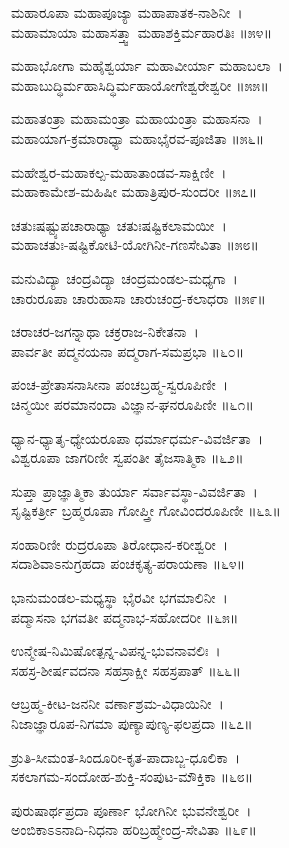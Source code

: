 ಮಹಾರೂಪಾ ಮಹಾಪೂಜ್ಯಾ ಮಹಾಪಾತಕ-ನಾಶಿನೀ~।\\
ಮಹಾಮಾಯಾ ಮಹಾಸತ್ತ್ವಾ ಮಹಾಶಕ್ತಿರ್ಮಹಾರತಿಃ ॥೫೪॥

ಮಹಾಭೋಗಾ ಮಹೈಶ್ವರ್ಯಾ ಮಹಾವೀರ್ಯಾ ಮಹಾಬಲಾ~।\\
ಮಹಾಬುದ್ಧಿರ್ಮಹಾಸಿದ್ಧಿರ್ಮಹಾಯೋಗೇಶ್ವರೇಶ್ವರೀ ॥೫೫॥

ಮಹಾತಂತ್ರಾ ಮಹಾಮಂತ್ರಾ ಮಹಾಯಂತ್ರಾ ಮಹಾಸನಾ~।\\
ಮಹಾಯಾಗ-ಕ್ರಮಾರಾಧ್ಯಾ ಮಹಾಭೈರವ-ಪೂಜಿತಾ ॥೫೬॥

ಮಹೇಶ್ವರ-ಮಹಾಕಲ್ಪ-ಮಹಾತಾಂಡವ-ಸಾಕ್ಷಿಣೀ~।\\
ಮಹಾಕಾಮೇಶ-ಮಹಿಷೀ ಮಹಾತ್ರಿಪುರ-ಸುಂದರೀ ॥೫೭॥

ಚತುಃಷಷ್ಟ್ಯುಪಚಾರಾಢ್ಯಾ ಚತುಃಷಷ್ಟಿಕಲಾಮಯೀ~।\\
ಮಹಾಚತುಃ-ಷಷ್ಟಿಕೋಟಿ-ಯೋಗಿನೀ-ಗಣಸೇವಿತಾ ॥೫೮॥

ಮನುವಿದ್ಯಾ ಚಂದ್ರವಿದ್ಯಾ ಚಂದ್ರಮಂಡಲ-ಮಧ್ಯಗಾ~।\\
ಚಾರುರೂಪಾ ಚಾರುಹಾಸಾ ಚಾರುಚಂದ್ರ-ಕಲಾಧರಾ ॥೫೯॥

ಚರಾಚರ-ಜಗನ್ನಾಥಾ ಚಕ್ರರಾಜ-ನಿಕೇತನಾ~।\\
ಪಾರ್ವತೀ ಪದ್ಮನಯನಾ ಪದ್ಮರಾಗ-ಸಮಪ್ರಭಾ ॥೬೦॥

ಪಂಚ-ಪ್ರೇತಾಸನಾಸೀನಾ ಪಂಚಬ್ರಹ್ಮ-ಸ್ವರೂಪಿಣೀ~।\\
ಚಿನ್ಮಯೀ ಪರಮಾನಂದಾ ವಿಜ್ಞಾನ-ಘನರೂಪಿಣೀ ॥೬೧॥

ಧ್ಯಾನ-ಧ್ಯಾತೃ-ಧ್ಯೇಯರೂಪಾ ಧರ್ಮಾಧರ್ಮ-ವಿವರ್ಜಿತಾ~।\\
ವಿಶ್ವರೂಪಾ ಜಾಗರಿಣೀ ಸ್ವಪಂತೀ ತೈಜಸಾತ್ಮಿಕಾ ॥೬೨॥

ಸುಪ್ತಾ ಪ್ರಾಜ್ಞಾತ್ಮಿಕಾ ತುರ್ಯಾ ಸರ್ವಾವಸ್ಥಾ-ವಿವರ್ಜಿತಾ~।\\
ಸೃಷ್ಟಿಕರ್ತ್ರೀ ಬ್ರಹ್ಮರೂಪಾ ಗೋಪ್ತ್ರೀ ಗೋವಿಂದರೂಪಿಣೀ ॥೬೩॥

ಸಂಹಾರಿಣೀ ರುದ್ರರೂಪಾ ತಿರೋಧಾನ-ಕರೀಶ್ವರೀ~।\\
ಸದಾಶಿವಾಽನುಗ್ರಹದಾ ಪಂಚಕೃತ್ಯ-ಪರಾಯಣಾ ॥೬೪॥

ಭಾನುಮಂಡಲ-ಮಧ್ಯಸ್ಥಾ ಭೈರವೀ ಭಗಮಾಲಿನೀ~।\\
ಪದ್ಮಾಸನಾ ಭಗವತೀ ಪದ್ಮನಾಭ-ಸಹೋದರೀ ॥೬೫॥

ಉನ್ಮೇಷ-ನಿಮಿಷೋತ್ಪನ್ನ-ವಿಪನ್ನ-ಭುವನಾವಲಿಃ~।\\
ಸಹಸ್ರ-ಶೀರ್ಷವದನಾ ಸಹಸ್ರಾಕ್ಷೀ ಸಹಸ್ರಪಾತ್ ॥೬೬॥

ಆಬ್ರಹ್ಮ-ಕೀಟ-ಜನನೀ ವರ್ಣಾಶ್ರಮ-ವಿಧಾಯಿನೀ~।\\
ನಿಜಾಜ್ಞಾರೂಪ-ನಿಗಮಾ ಪುಣ್ಯಾಪುಣ್ಯ-ಫಲಪ್ರದಾ ॥೬೭॥

ಶ್ರುತಿ-ಸೀಮಂತ-ಸಿಂದೂರೀ-ಕೃತ-ಪಾದಾಬ್ಜ-ಧೂಲಿಕಾ~।\\
ಸಕಲಾಗಮ-ಸಂದೋಹ-ಶುಕ್ತಿ-ಸಂಪುಟ-ಮೌಕ್ತಿಕಾ ॥೬೮॥

ಪುರುಷಾರ್ಥಪ್ರದಾ ಪೂರ್ಣಾ ಭೋಗಿನೀ ಭುವನೇಶ್ವರೀ~।\\
ಅಂಬಿಕಾಽಽನಾದಿ-ನಿಧನಾ ಹರಿಬ್ರಹ್ಮೇಂದ್ರ-ಸೇವಿತಾ ॥೬೯॥

